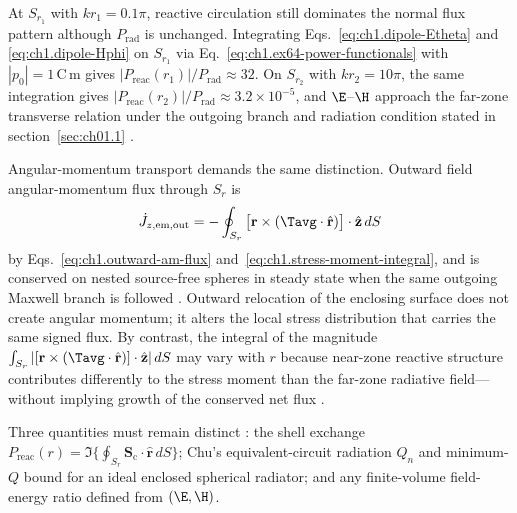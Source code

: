 At $S_{r_1}$ with $kr_1=0.1\pi$, reactive circulation still dominates the normal flux pattern although $P_{\mathrm{rad}}$ is unchanged. Integrating Eqs.~\eqref{eq:ch1.dipole-Etheta} and \eqref{eq:ch1.dipole-Hphi} on $S_{r_1}$ via Eq.~\eqref{eq:ch1.ex64-power-functionals} with $|p_0|=1\,\mathrm{C\,m}$ gives $|P_{\mathrm{reac}}(r_1)|/P_{\mathrm{rad}}\approx 32$. On $S_{r_2}$ with $kr_2=10\pi$, the same integration gives $|P_{\mathrm{reac}}(r_2)|/P_{\mathrm{rad}}\approx 3.2\times 10^{-5}$, and $\E$--$\H$ approach the far-zone transverse relation
under the outgoing branch and radiation condition stated in section~\ref{sec:ch01.1} \cite{stratton1941}.

Angular-momentum transport demands the same distinction. Outward field angular-momentum flux through $S_r$ is
\begin{equation}
\label{eq:ch1.ex64-am-flux-integral}
\dot J_{z,\mathrm{em,out}}
=-\oint_{S_r}\big[\mathbf{r}\times(\Tavg\cdot\hat{\mathbf{r}})\big]\cdot\hat{\mathbf{z}}\,dS
\end{equation}
by Eqs.~\eqref{eq:ch1.outward-am-flux} and~\eqref{eq:ch1.stress-moment-integral}, and is conserved on nested source-free spheres in steady state when the same outgoing Maxwell branch is followed \cite{stratton1941}. Outward relocation of the enclosing surface does not create angular momentum; it alters the local stress distribution that carries the same signed flux. By contrast, the integral of the magnitude $\int_{S_r}|[\mathbf{r}\times(\Tavg\cdot\hat{\mathbf{r}})]\cdot\hat{\mathbf{z}}|\,dS$ may vary with $r$ because near-zone reactive structure contributes differently to the stress moment than the far-zone radiative field---without implying growth of the conserved net flux \cite{stratton1941,beth1936}.

Three quantities must remain distinct \cite{chu1948,mcclean1996,stratton1941}: the shell exchange $P_{\mathrm{reac}}(r)=\Im\{\oint_{S_r}\mathbf{S}_\mathrm{c}\cdot\hat{\mathbf{r}}\,dS\}$; Chu's equivalent-circuit radiation $Q_n$ and minimum-$Q$ bound for an ideal enclosed spherical radiator; and any finite-volume field-energy ratio defined from $(\E,\H)$.

